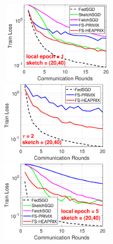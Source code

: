 \documentclass[11pt]{article}
\begin{document}
\begin{figure}[h]
	\begin{center}
		\mbox{%
		 \includegraphics[width=2.2in]{MNIST_figures/local1_sketch20_iid1_train_loss.eps} 
		\includegraphics[width=2.2in]{MNIST_figures/local2_sketch20_iid1_train_loss.eps} 
		\includegraphics[width=2.2in]{MNIST_figures/local5_sketch20_iid1_train_loss.eps}}
		

\end{center}
\end{figure}
\end{document}
